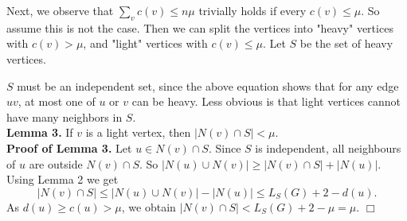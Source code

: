 Next, we observe that $\sum_v c(v) \leq n\mu$ trivially holds if every $c(v) \leq \mu$. So assume this is not the case. Then we can split the vertices into "heavy" vertices with $c(v) > \mu$, and "light" vertices with $c(v) \leq \mu$. Let $S$ be the set of heavy vertices.

$S$ must be an independent set, since the above equation shows that for any edge $uv$, at most one of $u$ or $v$ can be heavy. Less obvious is that light vertices cannot have many neighbors in $S$.
\\
\textbf{Lemma 3.} If $v$ is a light vertex, then $|N(v) \cap S| < \mu$.
\\
\textbf{Proof of Lemma 3.} Let $u \in N(v) \cap S$. Since $S$ is independent, all neighbours of $u$ are outside $N(v) \cap S$. So $|N(u) \cup N(v)| \geq |N(v) \cap S| + |N(u)|$. Using Lemma 2 we get
$$
|N(v) \cap S| \leq |N(u) \cup N(v)| - |N(u)| \leq L_S(G) + 2 - d(u).
$$
As $d(u) \geq c(u) > \mu$, we obtain $|N(v) \cap S| < L_S(G) + 2 - \mu = \mu$. $\Box$


